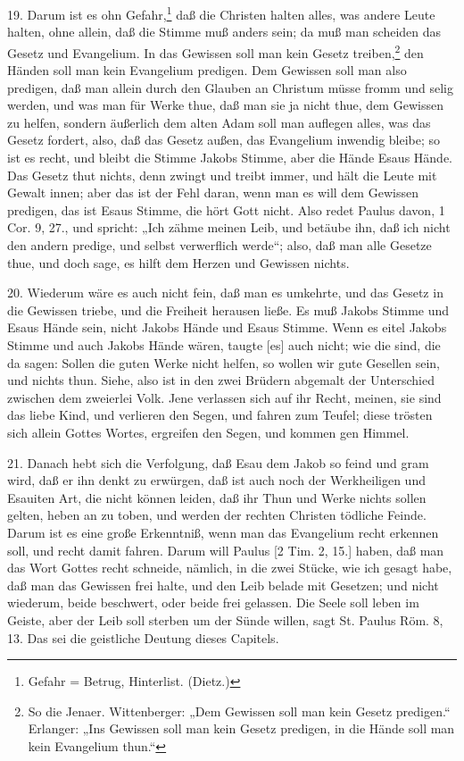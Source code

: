 19. Darum ist es ohn Gefahr,\footnote{Gefahr = Betrug, Hinterlist. (Dietz.)} daß die Christen halten alles, was andere Leute halten,
ohne allein, daß die Stimme muß anders sein; da muß man scheiden das Gesetz und Evangelium. In das Gewissen soll man kein Gesetz treiben,\footnote{So die Jenaer. Wittenberger: „Dem Gewissen soll man kein Gesetz predigen.“ Erlanger: „Ins Gewissen soll man kein Gesetz predigen, in die Hände soll man kein Evangelium thun.“} den Händen soll man kein Evangelium predigen. Dem Gewissen soll man also predigen, daß man allein durch den Glauben an Christum müsse fromm und selig werden, und was man für Werke thue, daß man sie ja nicht thue, dem Gewissen zu helfen, sondern äußerlich dem alten Adam soll man auflegen alles, was das Gesetz fordert, also, daß das Gesetz außen, das Evangelium inwendig bleibe; so ist es recht, und bleibt die Stimme Jakobs Stimme, aber die Hände Esaus Hände. Das Gesetz thut nichts, denn zwingt und treibt immer, und hält die Leute mit Gewalt innen; aber das ist der Fehl daran, wenn man es will dem Gewissen predigen, das ist Esaus Stimme, die hört Gott nicht. Also redet Paulus davon, 1 Cor. 9, 27., und spricht: „Ich zähme meinen Leib, und betäube ihn, daß ich nicht den andern predige, und selbst verwerflich werde“; also, daß man alle Gesetze thue, und doch sage, es hilft dem Herzen und Gewissen nichts.

20. Wiederum wäre es auch nicht fein, daß man es umkehrte, und das Gesetz in die Gewissen triebe, und die Freiheit herausen ließe. Es muß Jakobs Stimme und Esaus Hände sein, nicht Jakobs Hände und Esaus Stimme. Wenn es eitel Jakobs Stimme und auch Jakobs Hände wären, taugte [es] auch nicht; wie die sind, die da sagen: Sollen die guten Werke nicht helfen, so wollen wir gute Gesellen sein, und nichts thun. Siehe, also ist in den zwei Brüdern abgemalt der Unterschied zwischen dem zweierlei Volk. Jene verlassen sich auf ihr Recht, meinen, sie sind das liebe Kind, und verlieren den Segen, und fahren zum Teufel; diese trösten sich allein Gottes Wortes, ergreifen den Segen, und kommen gen Himmel.

21. Danach hebt sich die Verfolgung, daß Esau dem Jakob so feind und gram wird, daß er ihn denkt zu erwürgen, daß ist auch noch der Werkheiligen und Esauiten Art, die nicht können leiden, daß ihr Thun und Werke nichts sollen gelten, heben an zu toben, und werden der rechten Christen tödliche Feinde. Darum ist es eine große Erkenntniß, wenn man das Evangelium recht erkennen soll, und recht damit fahren. Darum will Paulus [2 Tim. 2, 15.] haben, daß man das Wort Gottes recht schneide, nämlich, in die zwei Stücke, wie ich gesagt habe, daß man das Gewissen frei halte, und den Leib belade mit Gesetzen; und nicht wiederum, beide beschwert, oder beide frei gelassen. Die Seele soll leben im Geiste, aber der Leib soll sterben um der Sünde willen, sagt St. Paulus Röm. 8, 13. Das sei die geistliche Deutung dieses Capitels.


